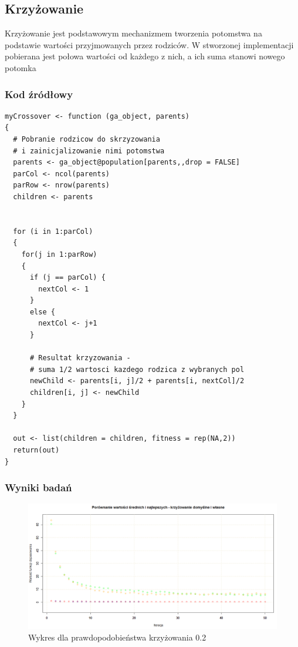 \newpage
\subsection{Krzyżowanie}

Krzyżowanie jest podstawowym mechanizmem tworzenia potomstwa na podstawie wartości przyjmowanych przez rodziców. W stworzonej implementacji pobierana jest połowa wartości od każdego z nich, a ich suma stanowi nowego potomka

\subsubsection{Kod źródłowy}

\begin{lstlisting}[linewidth=16.0cm]
myCrossover <- function (ga_object, parents)
{
  # Pobranie rodzicow do skrzyzowania
  # i zainicjalizowanie nimi potomstwa
  parents <- ga_object@population[parents,,drop = FALSE]
  parCol <- ncol(parents)
  parRow <- nrow(parents)
  children <- parents

  
  for (i in 1:parCol)
  { 
	for(j in 1:parRow)
	{
	  if (j == parCol) {  
	    nextCol <- 1 
	  }
	  else {
	    nextCol <- j+1
      }
      
      # Resultat krzyzowania - 
      # suma 1/2 wartosci kazdego rodzica z wybranych pol
	  newChild <- parents[i, j]/2 + parents[i, nextCol]/2
	  children[i, j] <- newChild
	}
  }

  out <- list(children = children, fitness = rep(NA,2))
  return(out)
}
\end{lstlisting}

\subsubsection{Wyniki badań}

\begin{figure}[H]
	\centering
	\hspace*{-0.8in}
	\includegraphics[scale = 0.5]{img/zad1/cross_0_2}
	\caption{Wykres dla prawdopodobieństwa krzyżowania 0.2}  
	\label{rys:cross_0_2} 
\end{figure}



